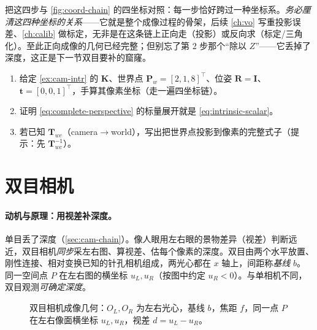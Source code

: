 \noindent 把这四步与 \cref{fig:coord-chain} 的四坐标对照：每一步恰好跨过一种坐标系。\emph{务必厘清这四种坐标的关系}\cite{gaoxiang2019slam14}——它就是整个成像过程的骨架，后续 \cref{ch:vo} 写重投影误差、\cref{ch:calib} 做标定，无非是在这条链上正向走（投影）或反向求（标定/三角化）。至此正向成像的几何已经完整；但别忘了第 2 步那个“除以 $Z$”——它丢掉了深度，这正是下一节双目要补的窟窿。

\begin{practice}
\begin{enumerate}
  \item 给定 \cref{ex:cam-intr} 的 $\mathbf{K}$、世界点 $\mathbf{P}_w=[2,1,8]^\top$、位姿 $\mathbf{R}=\mathbf{I}$、$\mathbf{t}=[0,0,1]^\top$，手算其像素坐标（走一遍四坐标链）。
  \item 证明 \cref{eq:complete-perspective} 的标量展开就是 \cref{eq:intrinsic-scalar}。
  \item 若已知 $\mathbf{T}_{wc}$（camera$\to$world），写出把世界点投影到像素的完整式子（提示：先 $\mathbf{T}_{wc}^{-1}$）。
\end{enumerate}
\end{practice}

\section{双目相机}
\label{sec:cam-stereo}

\paragraph{动机与原理：用视差补深度。}
单目丢了深度（\cref{sec:cam-chain}）。像人眼用左右眼的景物差异（视差）判断远近，双目相机\emph{同步}采左右图、算视差、估每个像素的深度\cite{gaoxiang2019slam14}。双目由两个水平放置、刚性连接、相对变换已知的针孔相机组成，两光心都在 $x$ 轴上，间距称\emph{基线} $b$。同一空间点 $P$ 在左右图的横坐标 $u_L,u_R$（按图中约定 $u_R<0$）。与单相机不同，双目观测\emph{可确定深度}\cite{barfoot2024state}。

\begin{figure}[ht]
\centering
{}
\caption{双目相机成像几何：$O_L,O_R$ 为左右光心，基线 $b$，焦距 $f$，同一点 $P$ 在左右像面横坐标 $u_L,u_R$，视差 $d=u_L-u_R$。}
\label{fig:cam-stereo}
\end{figure}

